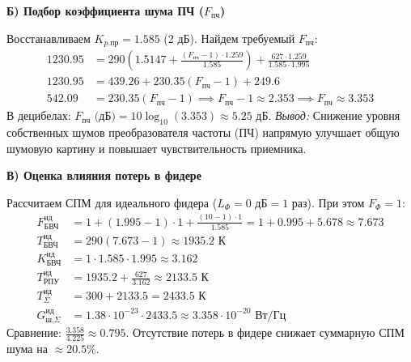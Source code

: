 \textbf{Б) Подбор коэффициента шума ПЧ ($F_{\text{пч}}$)}

Восстанавливаем $K_{p.\text{пр}} = 1.585$ (2 дБ). Найдем требуемый $F_{\text{пч}}$:
\begin{align*}
1230.95 &= 290 \left( 1.5147 + \frac{(F_{\text{пч}} - 1) \cdot 1.259}{1.585} \right) + \frac{627 \cdot 1.259}{1.585 \cdot 1.995} \\
1230.95 &= 439.26 + 230.35 (F_{\text{пч}} - 1) + 249.6 \\
542.09 &= 230.35(F_{\text{пч}} - 1) \implies F_{\text{пч}} - 1 \approx 2.353 \implies F_{\text{пч}} \approx 3.353
\end{align*}
В децибелах: $F_{\text{пч}} \text{ (дБ)} = 10 \log_{10}(3.353) \approx 5.25 \text{ дБ}$.
\textit{Вывод:} Снижение уровня собственных шумов преобразователя частоты (ПЧ) напрямую улучшает общую шумовую картину и повышает чувствительность приемника.

\begin{center}
\end{center}

\textbf{В) Оценка влияния потерь в фидере}

Рассчитаем СПМ для идеального фидера ($L_{\Phi} = 0 \text{ дБ} = 1$ раз). При этом $F_{\Phi} = 1$:
\begin{align*}
F_{\text{БВЧ}}^{\text{ид}} &= 1 + (1.995 - 1)\cdot 1 + \frac{(10 - 1)\cdot 1}{1.585} = 1 + 0.995 + 5.678 \approx 7.673 \\
T_{\text{БВЧ}}^{\text{ид}} &= 290(7.673 - 1) \approx 1935.2 \text{ К} \\
K_{\text{БВЧ}}^{\text{ид}} &= 1 \cdot 1.585 \cdot 1.995 \approx 3.162 \\
T_{\text{РПУ}}^{\text{ид}} &= 1935.2 + \frac{627}{3.162} \approx 2133.5 \text{ К} \\
T_{\Sigma}^{\text{ид}} &= 300 + 2133.5 = 2433.5 \text{ К} \\
G_{ш.\Sigma}^{\text{ид}} &= 1.38 \cdot 10^{-23} \cdot 2433.5 \approx 3.358 \cdot 10^{-20} \text{ Вт/Гц}
\end{align*}
Сравнение: $\frac{3.358}{4.225} \approx 0.795$. Отсутствие потерь в фидере снижает суммарную СПМ шума на $\approx 20.5\%$.

\begin{center}
\end{center}

